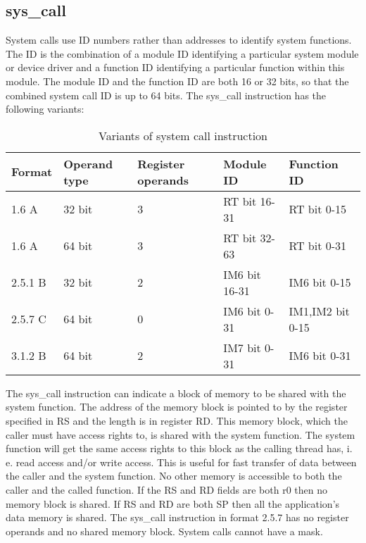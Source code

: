 \documentclass[forwardcom.tex]{subfiles}
\begin{document}
\vv


\subsection{sys\_call}
\label{systemCallInstruction}
System calls use ID numbers rather than addresses to identify system functions. 
The ID is the combination of a module ID identifying a particular system module or device driver and a function ID identifying a particular function within this module. The module ID and the function ID are both 16 or 32 bits, so that the combined system call ID is up to 64 bits.
The sys\_call instruction has the following variants:

\begin{longtable}
{|p{20mm}|p{20mm}|p{20mm}|p{30mm}|p{30mm}|}
\caption{Variants of system call instruction}
\label{table:sysCallInstruction}
\endfirsthead
\endhead
\hline
Format & Operand type & Register operands & Module ID & Function ID \\
\hline
1.6 A & 32 bit & 3 & RT bit 16-31 & RT bit 0-15 \\
\hline
1.6 A & 64 bit & 3 & RT bit 32-63 & RT bit 0-31 \\
\hline

2.5.1 B & 32 bit & 2  & IM6 bit 16-31 & IM6 bit 0-15 \\
\hline

2.5.7 C & 64 bit & 0  & IM6 bit 0-31 & IM1,IM2 bit 0-15 \\
\hline
3.1.2 B & 64 bit & 2  & IM7 bit 0-31 & IM6 bit 0-31 \\
\hline
\end{longtable}

The sys\_call instruction can indicate a block of memory to be shared with the system function. The address of the memory block is pointed to by the register specified in RS and the length is in register RD. This memory block, which the caller must have access rights to, is shared with the system function. The system function will get the same access rights to this block as the calling thread has, i. e. read access and/or write access. This is useful for fast transfer of data between the caller and the system function. No other memory is accessible to both the caller and the called function. If the RS and RD fields are both r0 then no memory block is shared. If RS and RD are both SP then all the application's data memory is shared. The sys\_call instruction in format 2.5.7 has no register operands and no shared memory block. System calls cannot have a mask.
\vv
\end{document}
